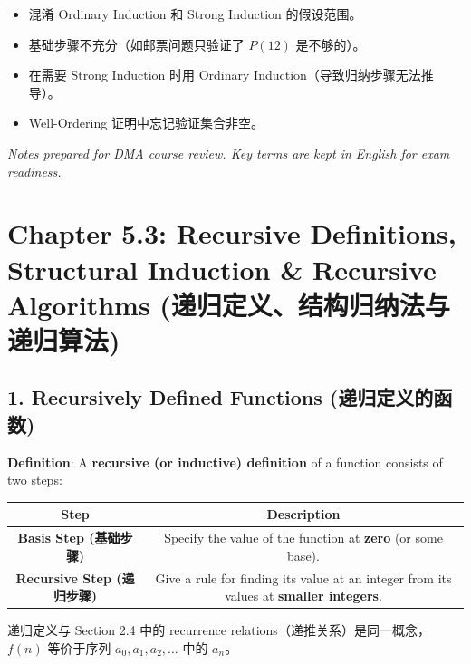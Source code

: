 \documentclass[10pt,a4paper,openany]{ctexbook}
\theoremstyle{definition}
\theoremstyle{remark}
\renewenvironment{quote}
  {\list{}{\leftmargin=1em\rightmargin=0pt\topsep=0.5pt\partopsep=0pt}\item[]}
  {\endlist}
\begin{document}
\begin{itemize}
\item 混淆 Ordinary Induction 和 Strong Induction 的假设范围。
\item 基础步骤不充分（如邮票问题只验证了 $P(12)$ 是不够的）。
\item 在需要 Strong Induction 时用 Ordinary Induction（导致归纳步骤无法推导）。
\item Well-Ordering 证明中忘记验证集合非空。

\end{itemize}

\vspace{-2pt}

\textit{Notes prepared for DMA course review. Key terms are kept in English for exam readiness.}


\section{Chapter 5.3: Recursive Definitions, Structural Induction \& Recursive Algorithms (递归定义、结构归纳法与递归算法)}

\vspace{-2pt}

\subsection{1. Recursively Defined Functions (递归定义的函数)}

\textbf{Definition}: A \textbf{recursive (or inductive) definition} of a function consists of two steps:
\begin{center}
\begin{tabular}{cc}
\hline
Step & Description \\ \hline
\textbf{Basis Step (基础步骤)} & Specify the value of the function at \textbf{zero} (or some base). \\
\textbf{Recursive Step (递归步骤)} & Give a rule for finding its value at an integer from its values at \textbf{smaller integers}. \\
\hline
\end{tabular}

\end{center}

\begin{quote}
递归定义与 Section 2.4 中的 recurrence relations（递推关系）是同一概念，$f(n)$ 等价于序列 $a_0, a_1, a_2, \dots$ 中的 $a_n$。

\end{quote}
\end{document}
